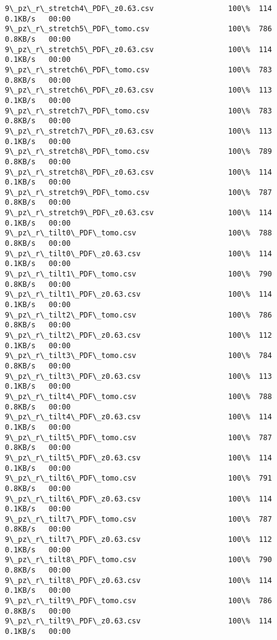 \documentclass[11pt]{article}
\begin{document}
\begin{Verbatim}[commandchars=\\\{\}]
9\_pz\_r\_stretch4\_PDF\_z0.63.csv                 100\%  114     0.1KB/s   00:00    
9\_pz\_r\_stretch5\_PDF\_tomo.csv                  100\%  786     0.8KB/s   00:00    
9\_pz\_r\_stretch5\_PDF\_z0.63.csv                 100\%  114     0.1KB/s   00:00    
9\_pz\_r\_stretch6\_PDF\_tomo.csv                  100\%  783     0.8KB/s   00:00    
9\_pz\_r\_stretch6\_PDF\_z0.63.csv                 100\%  113     0.1KB/s   00:00    
9\_pz\_r\_stretch7\_PDF\_tomo.csv                  100\%  783     0.8KB/s   00:00    
9\_pz\_r\_stretch7\_PDF\_z0.63.csv                 100\%  113     0.1KB/s   00:00    
9\_pz\_r\_stretch8\_PDF\_tomo.csv                  100\%  789     0.8KB/s   00:00    
9\_pz\_r\_stretch8\_PDF\_z0.63.csv                 100\%  114     0.1KB/s   00:00    
9\_pz\_r\_stretch9\_PDF\_tomo.csv                  100\%  787     0.8KB/s   00:00    
9\_pz\_r\_stretch9\_PDF\_z0.63.csv                 100\%  114     0.1KB/s   00:00    
9\_pz\_r\_tilt0\_PDF\_tomo.csv                     100\%  788     0.8KB/s   00:00    
9\_pz\_r\_tilt0\_PDF\_z0.63.csv                    100\%  114     0.1KB/s   00:00    
9\_pz\_r\_tilt1\_PDF\_tomo.csv                     100\%  790     0.8KB/s   00:00    
9\_pz\_r\_tilt1\_PDF\_z0.63.csv                    100\%  114     0.1KB/s   00:00    
9\_pz\_r\_tilt2\_PDF\_tomo.csv                     100\%  786     0.8KB/s   00:00    
9\_pz\_r\_tilt2\_PDF\_z0.63.csv                    100\%  112     0.1KB/s   00:00    
9\_pz\_r\_tilt3\_PDF\_tomo.csv                     100\%  784     0.8KB/s   00:00    
9\_pz\_r\_tilt3\_PDF\_z0.63.csv                    100\%  113     0.1KB/s   00:00    
9\_pz\_r\_tilt4\_PDF\_tomo.csv                     100\%  788     0.8KB/s   00:00    
9\_pz\_r\_tilt4\_PDF\_z0.63.csv                    100\%  114     0.1KB/s   00:00    
9\_pz\_r\_tilt5\_PDF\_tomo.csv                     100\%  787     0.8KB/s   00:00    
9\_pz\_r\_tilt5\_PDF\_z0.63.csv                    100\%  114     0.1KB/s   00:00    
9\_pz\_r\_tilt6\_PDF\_tomo.csv                     100\%  791     0.8KB/s   00:00    
9\_pz\_r\_tilt6\_PDF\_z0.63.csv                    100\%  114     0.1KB/s   00:00    
9\_pz\_r\_tilt7\_PDF\_tomo.csv                     100\%  787     0.8KB/s   00:00    
9\_pz\_r\_tilt7\_PDF\_z0.63.csv                    100\%  112     0.1KB/s   00:00    
9\_pz\_r\_tilt8\_PDF\_tomo.csv                     100\%  790     0.8KB/s   00:00    
9\_pz\_r\_tilt8\_PDF\_z0.63.csv                    100\%  114     0.1KB/s   00:00    
9\_pz\_r\_tilt9\_PDF\_tomo.csv                     100\%  786     0.8KB/s   00:00    
9\_pz\_r\_tilt9\_PDF\_z0.63.csv                    100\%  114     0.1KB/s   00:00    

    \end{Verbatim}
\end{document}
